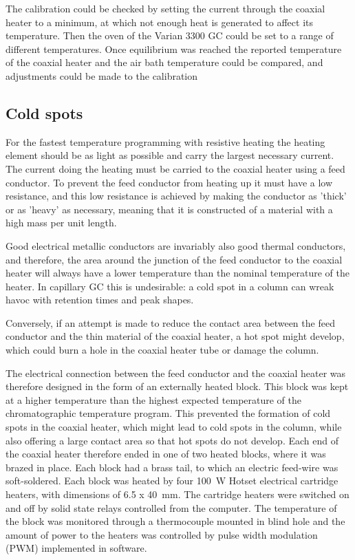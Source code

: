 The calibration could be checked by setting the current through the coaxial
heater to a minimum, at which not enough heat is generated to affect its
temperature. Then the oven of the Varian 3300 GC could be set to a range of
different temperatures. Once equilibrium was reached the reported temperature of
the coaxial heater and the air bath temperature could be compared, and
adjustments could be made to the calibration

\subsection{Cold spots}
\label{sec:ColdSpots}

For the fastest temperature programming with resistive heating the heating
element should be as light as possible and carry the largest necessary current.
The current doing the heating must be carried to the coaxial heater using a feed
conductor. To prevent the feed conductor from heating up it must have a low
resistance, and this low resistance is achieved by making the conductor as
'thick' or as 'heavy' as necessary, meaning that it is constructed of a material
with a high mass per unit length.

Good electrical metallic conductors are invariably also good thermal conductors,
and therefore, the area around the junction of the feed conductor to the coaxial
heater will always have a lower temperature than the nominal temperature of the
heater. In capillary GC this is undesirable: a cold spot in a column can wreak
havoc with retention times and peak shapes.

Conversely, if an attempt is made to reduce the contact area between the feed
conductor and the thin material of the coaxial heater, a hot spot might develop,
which could burn a hole in the coaxial heater tube or damage the column.

The electrical connection between the feed conductor and the coaxial heater was
therefore designed in the form of an externally heated block. This block was
kept at a higher temperature than the highest expected temperature of the
chromatographic temperature program. This prevented the formation of cold spots
in the coaxial heater, which might lead to cold spots in the column, while also
offering a large contact area so that hot spots do not develop. Each end of the
coaxial heater therefore ended in one of two heated blocks, where it was brazed
in place. Each block had a brass tail, to which an electric feed-wire was
soft-soldered. Each block was heated by four \SI{100}{\watt}
Hotset\texttrademark{} electrical cartridge heaters, with dimensions of \SI{6.5
x 40}{\milli\metre}. The cartridge heaters were switched on and off by solid
state relays controlled from the computer. The temperature of the block was
monitored through a thermocouple mounted in blind hole and the amount of power to
the heaters was controlled by pulse width modulation (PWM) implemented in
software.
 
